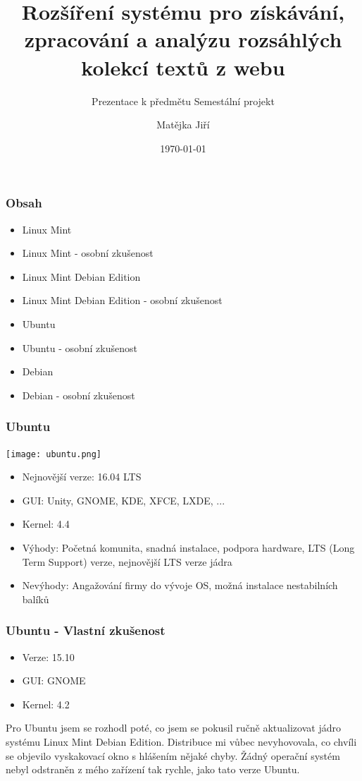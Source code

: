 \documentclass{beamer}
\title{Rozšíření systému pro získávání, zpracování a analýzu rozsáhlých kolekcí textů z webu}
\subtitle{Prezentace k předmětu Semestální projekt}
\author{Matějka Jiří}
\date{\today}
\begin{document}
  \frame{\titlepage}
  \begin{frame}
    \frametitle{Obsah}

    \begin{itemize}
      \item Linux Mint
      \item Linux Mint - osobní zkušenost
      \item Linux Mint Debian Edition
      \item Linux Mint Debian Edition - osobní zkušenost
      \item Ubuntu
      \item Ubuntu - osobní zkušenost
      \item Debian
      \item Debian - osobní zkušenost
    \end{itemize}
  \end{frame}
  \begin{frame}
    \frametitle{Ubuntu}
    \hspace{2mm}
    \texttt{[image: ubuntu.png]}
	\begin{itemize}
		\item Nejnovější verze: 16.04 LTS
		\item GUI: Unity, GNOME, KDE, XFCE, LXDE, ...
		\item Kernel: 4.4
		\item Výhody: Početná komunita, snadná instalace, podpora hardware, LTS (Long Term Support) verze, nejnovější LTS verze jádra
		\item Nevýhody: Angažování firmy do vývoje OS, možná instalace nestabilních balíků
	\end{itemize}
  \end{frame}
  \begin{frame}
    \frametitle{Ubuntu - Vlastní zkušenost}
      \begin{itemize}
	\item Verze: 15.10
	\item GUI: GNOME
	\item Kernel: 4.2
      \end{itemize}
      Pro Ubuntu jsem se rozhodl poté, co jsem se pokusil ručně aktualizovat
      jádro systému Linux Mint Debian Edition. Distribuce mi vůbec nevyhovovala,
      co chvíli se objevilo vyskakovací okno s hlášením nějaké chyby. Žádný operační systém
      nebyl odstraněn z mého zařízení tak rychle, jako tato verze Ubuntu.
  \end{frame}
\end{document}
